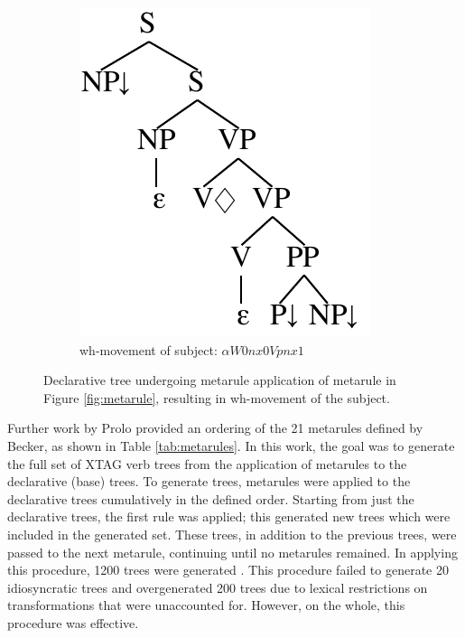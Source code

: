 \documentclass[11pt,a4paper]{article}
\begin{document}
\begin{figure}[h]
\begin{subfigure}{0.38\textwidth}
        \includegraphics[width=1.0 \linewidth ]{resources/ch5_resources/metarule_subject_extracted.pdf}
        \caption{wh-movement of subject: $\alpha W0nx0Vpnx1$}
        \label{fig:metarule_subject_extracted}
    \end{subfigure}
    \hfill
    \centering
    \caption{Declarative tree undergoing metarule application of metarule in Figure \ref{fig:metarule}, resulting in wh-movement of the subject.}
    \label{fig:metarule_application}
\end{figure}

Further work by Prolo \cite{prolo2002generating} provided an ordering of the 21
metarules defined by Becker, as shown in Table \ref{tab:metarules}. In this work, the goal was to generate the full set
of XTAG verb trees from the application of metarules to the declarative (base)
trees. To generate trees, metarules were applied to the declarative trees
cumulatively in the defined order. Starting from just the declarative trees, the
first rule was applied; this generated new trees which were included in the
generated set.  These trees, in addition to the previous trees, were passed to
the next metarule, continuing until no metarules remained. In applying this
procedure, 1200 trees were generated \cite{prolo2002generating}. This procedure
failed to generate 20 idiosyncratic  trees and overgenerated 200 trees due to
lexical restrictions on transformations that were unaccounted for. However, on
the whole, this procedure was effective.
\end{document}
